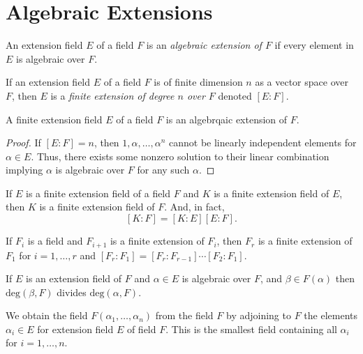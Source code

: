 \section{Algebraic Extensions}

\begin{definition}
    An extension field $E$ of a field $F$ is an \emph{algebraic extension of $F$} if every element in $E$ is algebraic over $F$.
\end{definition}
\begin{definition}
    If an extension field $E$ of a field $F$ is of finite dimension $n$ as a vector space over $F$, then $E$ is a \emph{finite extension of degree $n$ over $F$} denoted $[E:F]$.
\end{definition}
\begin{theorem}
    A finite extension field $E$ of a field $F$ is an algebrqaic extension of $F$.
\end{theorem}
\begin{proof}
    If $[E:F] = n$, then $1,\alpha, \ldots, \alpha^n$ cannot be linearly independent elements for $\alpha \in E$. Thus, there exists some nonzero solution to their linear combination implying $\alpha$ is algebraic over $F$ for any such $\alpha$.
\end{proof}
\begin{theorem}
    If $E$ is a finite extension field of a field $F$ and $K$ is a finite extension field of $E$, then $K$ is a finite extension field of $F$. And, in fact, $$[K:F] = [K:E][E:F].$$
\end{theorem}
\begin{corollary}
    If $F_i$ is a field and $F_{i+1}$ is a finite extension of $F_i$, then $F_r$ is a finite extension of $F_1$ for $i=1,\ldots,r$ and $[F_r:F_1]=[F_r:F_{r-1}]\cdots[F_2:F_1]$.
\end{corollary}
\begin{corollary}
    If $E$ is an extension field of $F$ and $\alpha \in E$ is algebraic over $F$, and $\beta \in F(\alpha)$ then $\text{deg}(\beta, F)$ divides $\text{deg}(\alpha, F)$.
\end{corollary}
\begin{definition}[Adjoining to $F$]
    We obtain the field $F(\alpha_1, \ldots, \alpha_n)$ from the field $F$ by adjoining to $F$ the elements $\alpha_i \in E$ for extension field $E$ of field $F$. This is the smallest field containing all $\alpha_i$ for $i = 1,\ldots, n$.
\end{definition}
